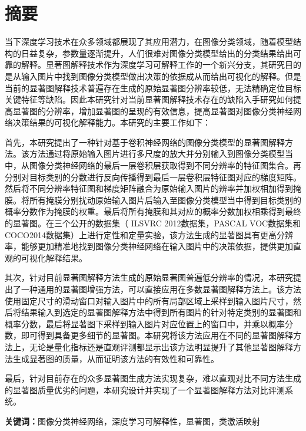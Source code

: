 


\chapter{摘\quad 要}
\xiaosi

当下深度学习技术在众多领域都展现了其应用潜力，在图像分类领域，随着模型结构的日益复杂，参数量逐渐提升，人们很难对图像分类模型给出的分类结果给出可靠的解释。显著图解释技术作为深度学习可解释工作的一个新兴分支，其研究目的是从输入图片中找到图像分类模型做出决策的依据成从而给出可视化的解释。但是当前的显著图解释技术普遍存在生成的原始显著图分辨率较低，无法精确定位目标关键特征等缺陷。因此本研究针对当前显著图解释技术存在的缺陷入手研究如何提高显著图的分辨率，增加显著图的呈现的有效信息，提高显著图对图像分类神经网络决策结果的可视化解释能力。本研究的主要工作如下：

首先，本研究提出了一种针对基于卷积神经网络的图像分类模型的显著图解释方法。该方法通过将原始输入图片进行多尺度的放大并分别输入到图像分类模型当中，从图像分类神经网络的最后一层卷积层获取得到不同分辨率的特征图集合。再分别对目标类别的分数进行反向传播得到最后一层卷积层特征图对应的梯度矩阵。然后将不同分辨率特征图和梯度矩阵融合为原始输入图片的辨率并加权相加得到掩膜。将所有掩膜分别扰动原始输入图片后输入至图像分类模型当中得到目标类别的概率分数作为掩膜的权重。最后将所有掩膜和其对应的概率分数加权相乘得到最终的显著图。在三个公开的数据集（ ILSVRC 2012数据集，PASCAL VOC数据集和COCO2014数据集）上进行定性和定量实验，该方法生成的显著图具有更高分辨率，能够更加精准地找到图像分类神经网络在输入图片中的决策依据，提供更加直观的可视化解释结果。

其次，针对目前显著图解释方法生成的原始显著图普遍低分辨率的情况，本研究提出了一种通用的显著图增强方法，可以直接应用在多数显著图解释方法上。该方法使用固定尺寸的滑动窗口对输入图片中的所有局部区域上采样到输入图片尺寸，然后将结果输入到选定的显著图解释方法中得到所有图片的针对特定类别的显著图和概率分数，最后将显著图下采样到输入图片对应位置上的窗口中，并乘以概率分数，即可得到具备更多细节的显著图。本研究将该方法应用在不同的显著图解释方法上，无论是量化指标还是直观评测都显示出该方法明显提升了其他显著图解释方法生成显著图的质量，从而证明该方法的有效性和可靠性。

最后，针对目前存在的众多显著图生成方法实现复杂，难以直观对比不同方法生成的显著图质量优劣的问题，本研究设计并实现了一个显著图解释方法对比评测系统。

\noindent\songti\textbf{关键词：}图像分类神经网络，深度学习可解释性，显著图，类激活映射

\clearpage
